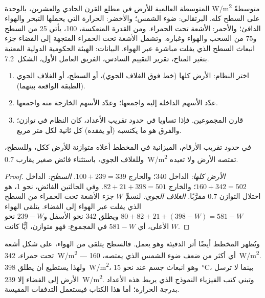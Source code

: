 \begin{omfigure}
{\small {} المتوسطة العالمية للأرض في مطلع القرن الحادي والعشرين،
بالوحدة \unit{W/m^2} متوسطةً على السطح كله. البرتقالي: ضوء الشمس؛ والأخضر: الحرارة
التي يحملها التبخر والهواء الدافئ؛ والأحمر: الأشعة تحت الحمراء. ومن القدرة
المنعكسة، 100، يأتي 25 من السطح و75 من السحب والهواء وغباره. وتشمل الأشعة تحت الحمراء
المتجهة إلى الفضاء جزء انبعاث السطح الذي يفلت مباشرة عبر الهواء. البيانات:
الهيئة الحكومية الدولية المعنية بتغير المناخ، تقرير التقييم السادس، الفريق
العامل الأول، الشكل~7.2.}
\end{omfigure}

\begin{method}\label{met:g10:earth-energy-budget:reading}
\begin{enumerate}
  \item اختر النظام: الأرض كلها (خط فوق الغلاف الجوي)، أو السطح، أو الغلاف
        الجوي (الطبقة الواقعة بينهما).
  \item عدّد الأسهم الداخلة إليه واجمعها؛ وعدّد الأسهم الخارجة منه
        واجمعها.
  \item قارن المجموعين. فإذا تساويا في حدود تقريب الأعداد، كان النظام في
        توازن؛ والفرق هو ما يكتسبه (أو يفقده) كل ثانية لكل متر
        مربع.
\end{enumerate}
\end{method}

\begin{proposition}\label{prop:g10:earth-energy-budget:balance}
في حدود تقريب الأرقام، الميزانية في المخطط أعلاه متوازنة للأرض ككل، وللسطح،
وللغلاف الجوي، باستثناء فائض صغير يقارب \qty{0.7}{W/m^2} تمتصه الأرض ولا
تعيده.
\end{proposition}

\begin{proof}
\emph{الأرض كلها:} الداخل 340؛ والخارج $100 + 239 = 339$. \emph{السطح:} الداخل
$160 + 342 = 502$؛ والخارج $82 + 21 + 398 = 501$. وفي الحالتين الفائض،
نحو 1، هو اختلال التوازن 0.7 مقرَّبًا. \emph{الغلاف الجوي:} لنسمِّ $W$ جزء
الأشعة تحت الحمراء من السطح الذي يفلت عبر الهواء إلى الفضاء. يتلقى الهواء
$80 + 82 + 21 + (398 - W) = 581 - W$ ويطلق $342$ نحو الأسفل
و$239 - W$ نحو الأعلى، أي $581 - W$ في المجموع: فهو متوازن، أيًّا كانت $W$.
\end{proof}

ويُظهر المخطط أيضًا أثر الدفيئة وهو يعمل. فالسطح يتلقى من الهواء، على شكل أشعة تحت
حمراء، \qty{342}{W/m^2} --- أي أكثر من ضعف ضوء الشمس الذي يمتصه،
\qty{160}{W/m^2}. ولهذا يستطيع أن يطلق \qty{398}{W/m^2}، وهو انبعاث جسم عند نحو
\qty{15}{\degreeCelsius}، بينما لا ترسل الأرض إلى الفضاء إلا
\qty{239}{W/m^2}. وتبني كتب الفيزياء النموذج الذي يربط هذه الأعداد بدرجة الحرارة؛
أما هذا الكتاب فيستعمل التدفقات المقيسة.

